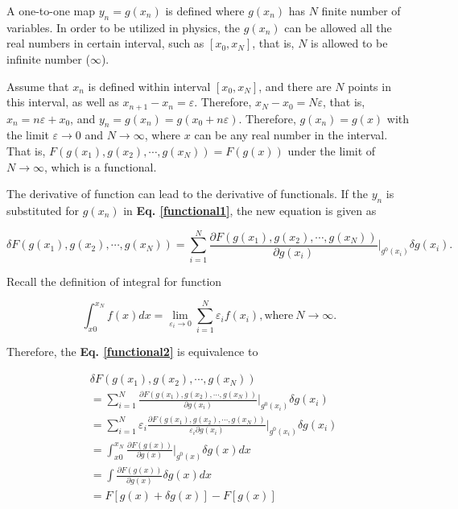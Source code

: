 \documentclass[a4paper, 12pt, titlepage,oneside,drop]{kthesis}
\begin{document}
A one-to-one map $y_n = g(x_n)$ is defined where $g(x_n)$ has $N$ finite number of variables. In order to be utilized in physics, the $g(x_n)$ can be allowed all the real numbers in certain interval, such as $[x_0, x_N]$, that is,
$N$ is allowed to be infinite number ($\infty$). 

Assume that $x_n$ is defined within interval $[x_0, x_N]$, and there are $N$ points in this interval, as well as $x_{n+1}-x_{n} = \varepsilon$. Therefore, $x_N-x_0 = N \varepsilon$, that is, $x_n = n \varepsilon + x_0$, 
and $y_n = g(x_n) = g (x_0+n \varepsilon)$. Therefore, $g(x_n) = g(x)$ with the limit $\varepsilon \rightarrow 0$ and $N \rightarrow \infty$,  where $x$ can be any real number in the interval. That is, $F(g(x_1), g(x_2), \cdots, g(x_N))
= F(g(x))$ under the limit of $N \rightarrow \infty$, which is a functional.

The derivative of function can lead to the derivative of functionals. If the $y_n$ is substituted for $g(x_n)$ in \textbf{Eq. \ref{functional1}}, the new equation is given as


\begin{equation}\label{functional2}
\delta F(g(x_1), g(x_2), \cdots, g(x_N)) = \sum\limits_{i = 1}^N \frac{\partial F(g(x_1), g(x_2), \cdots, g(x_N))}{\partial g(x_i)} {\Big |}_{g^0(x_i)}  \delta {g(x_i)}.
\end{equation}


Recall the definition of integral for function

\begin{equation}
 \int_{x0}^{x_N} f(x)dx = \lim\limits_{\varepsilon_{i} \rightarrow 0} \sum\limits_{i = 1}^{N} \varepsilon_{i}f(x_i), \mathrm{where}\ N \rightarrow  \infty.
\end{equation}


Therefore, the \textbf{Eq. \ref{functional2}} is equivalence to

\begin{equation}\begin{split}
& \delta F(g(x_1), g(x_2), \cdots, g(x_N)) \\
& = \sum\limits_{i = 1}^N \frac{\partial F(g(x_1), g(x_2), \cdots, g(x_N))}{\partial g(x_i)} {\Big |}_{g^0(x_i)}  \delta {g(x_i)} \\
& = \sum\limits_{i = 1}^N \varepsilon_i \frac{\partial F(g(x_1), g(x_2), \cdots, g(x_N))}{\varepsilon_i \partial g(x_i)} {\Big |}_{g^0(x_i)}  \delta {g(x_i)} \\
& =  \int_{x0}^{x_N} \frac{\partial F(g(x))}{\partial g(x)} {\Big |}_{g^0(x)} \delta g(x) dx \\
& = \int \frac{\partial F(g(x))}{\partial g(x)} \delta g(x) dx \\
& = F[g(x) + \delta g(x)] - F[g(x)]
\end{split}
\end{equation}
\end{document}
